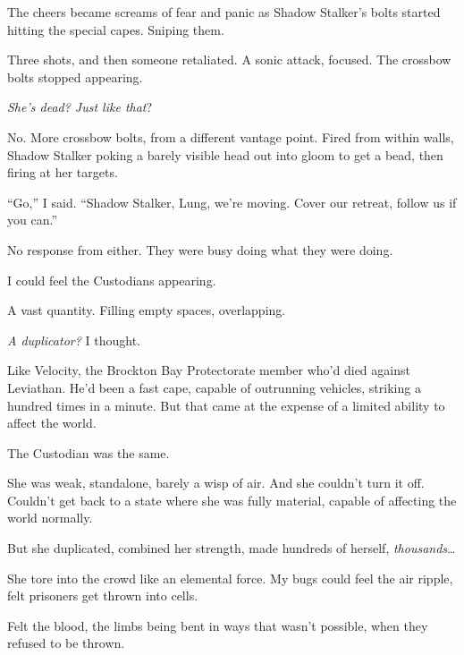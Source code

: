The cheers became screams of fear and panic as Shadow Stalker's bolts started hitting the special capes.  Sniping them.



Three shots, and then someone retaliated.  A sonic attack, focused.  The crossbow bolts stopped appearing.



\emph{She's dead?  Just like that}?



No.  More crossbow bolts, from a different vantage point.  Fired from within walls, Shadow Stalker poking a barely visible head out into gloom to get a bead, then firing at her targets.



``Go,'' I said.  ``Shadow Stalker, Lung, we're moving.  Cover our retreat, follow us if you can.''



No response from either.  They were busy doing what they were doing.



I could feel the Custodians appearing.



A vast quantity.  Filling empty spaces, overlapping.



\emph{A duplicator?}  I thought.



Like Velocity, the Brockton Bay Protectorate member who'd died against Leviathan.  He'd been a fast cape, capable of outrunning vehicles, striking a hundred times in a minute.  But that came at the expense of a limited ability to affect the world.



The Custodian was the same.



She was weak, standalone, barely a wisp of air.  And she couldn't turn it off.  Couldn't get back to a state where she was fully material, capable of affecting the world normally.



But she duplicated, combined her strength, made hundreds of herself, \emph{thousands}\ldots



She tore into the crowd like an elemental force.  My bugs could feel the air ripple, felt prisoners get thrown into cells.



Felt the blood, the limbs being bent in ways that wasn't possible, when they refused to be thrown.



